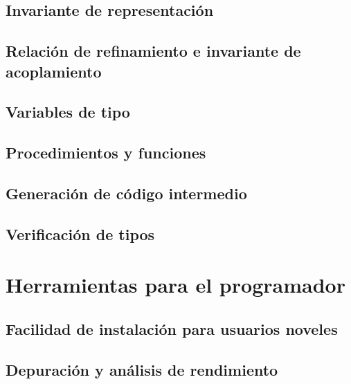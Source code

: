 \subsection{Invariante de representación}

\subsection{Relación de refinamiento e invariante de acoplamiento}

\subsection{Variables de tipo}

\subsection{Procedimientos y funciones}

\subsection{Generación de código intermedio}

\subsection{Verificación de tipos}
\blindtext[1]

\section{Herramientas para el programador}
\subsection{Facilidad de instalación para usuarios noveles}
\blindtext[1]

\subsection{Depuración y análisis de rendimiento}
\blindtext[1]
